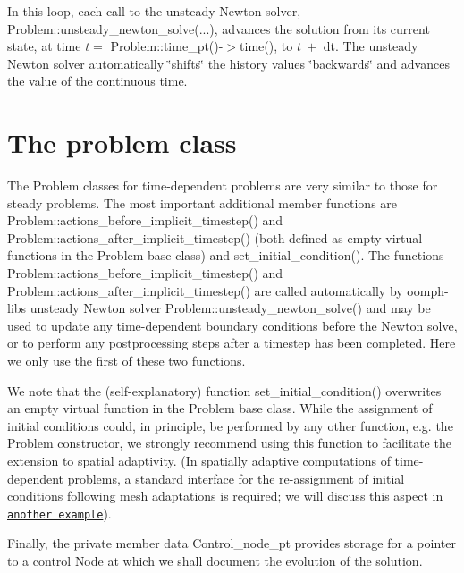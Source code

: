 In this loop, each call to the unsteady Newton solver, {\ttfamily Problem\+::unsteady\+\_\+newton\+\_\+solve}(...), advances the solution from its current state, at time $ t = $ {\ttfamily Problem\+::time\+\_\+pt()-\/$>$time()}, to $ t \ + $ {\ttfamily dt}. The unsteady Newton solver automatically \char`\"{}shifts\char`\"{} the history values \char`\"{}backwards\char`\"{} and advances the value of the continuous time.



 

\hypertarget{index_problem}{}\section{The problem class}\label{index_problem}
The {\ttfamily Problem} classes for time-\/dependent problems are very similar to those for steady problems. The most important additional member functions are {\ttfamily Problem\+::actions\+\_\+before\+\_\+implicit\+\_\+timestep()} and {\ttfamily Problem\+::actions\+\_\+after\+\_\+implicit\+\_\+timestep()} (both defined as empty virtual functions in the {\ttfamily Problem} base class) and {\ttfamily set\+\_\+initial\+\_\+condition()}. The functions {\ttfamily Problem\+::actions\+\_\+before\+\_\+implicit\+\_\+timestep()} and {\ttfamily Problem\+::actions\+\_\+after\+\_\+implicit\+\_\+timestep()} are called automatically by {\ttfamily oomph-\/lib\textquotesingle{}s} unsteady Newton solver {\ttfamily Problem\+::unsteady\+\_\+newton\+\_\+solve()} and may be used to update any time-\/dependent boundary conditions before the Newton solve, or to perform any postprocessing steps after a timestep has been completed. Here we only use the first of these two functions.

We note that the (self-\/explanatory) function {\ttfamily set\+\_\+initial\+\_\+condition()} overwrites an empty virtual function in the {\ttfamily Problem} base class. While the assignment of initial conditions could, in principle, be performed by any other function, e.\+g. the {\ttfamily Problem} constructor, we strongly recommend using this function to facilitate the extension to spatial adaptivity. (In spatially adaptive computations of time-\/dependent problems, a standard interface for the re-\/assignment of initial conditions following mesh adaptations is required; we will discuss this aspect in \href{../../../unsteady_heat/two_d_unsteady_heat_adapt/html/index.html}{\tt another example}).

Finally, the private member data {\ttfamily Control\+\_\+node\+\_\+pt} provides storage for a pointer to a control {\ttfamily Node} at which we shall document the evolution of the solution.

